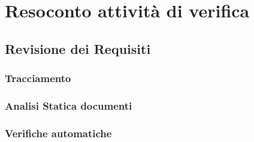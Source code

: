 \documentclass[PianoDiProgetto.tex]{subfiles}
\begin{document}
\chapter{Resoconto attività di verifica}

\section{Revisione dei Requisiti}
	\subsection{Tracciamento}
	\subsection{Analisi Statica documenti}
	\subsection{Verifiche automatiche}
	


\end{document}
